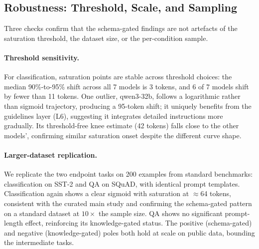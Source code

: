 \subsection{Robustness: Threshold, Scale, and Sampling}
\label{sec:result-robust}

Three checks confirm that the schema-gated findings are not artefacts of the
saturation threshold, the dataset size, or the per-condition sample.

\paragraph{Threshold sensitivity.}
For classification, saturation points are stable across threshold choices: the
median 90\%-to-95\% shift across all 7 models is 3 tokens, and 6 of 7 models
shift by fewer than 11 tokens. One outlier, qwen3-32b, follows a logarithmic
rather than sigmoid trajectory, producing a 95-token shift; it uniquely benefits
from the guidelines layer (L6), suggesting it integrates detailed instructions
more gradually. Its threshold-free knee estimate (42 tokens) falls close to the
other models', confirming similar saturation onset despite the different curve
shape.

\paragraph{Larger-dataset replication.}
We replicate the two endpoint tasks on 200 examples from standard benchmarks:
classification on SST-2 and QA on SQuAD, with identical prompt templates.
Classification again shows a clear sigmoid with saturation at $\approx$64
tokens, consistent with the curated main study and confirming the schema-gated
pattern on a standard dataset at $10\times$ the sample size. QA shows no
significant prompt-length effect, reinforcing its knowledge-gated status. The
positive (schema-gated) and negative (knowledge-gated) poles both hold at scale
on public data, bounding the intermediate tasks.

